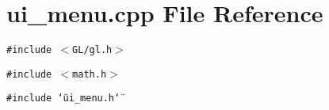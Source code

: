 \section{ui\_\-menu.cpp File Reference}
\label{ui__menu_8cpp}
{\tt \#include $<$GL/gl.h$>$}\par
{\tt \#include $<$math.h$>$}\par
{\tt \#include \char`\"{}ui\_\-menu.h\char`\"{}}\par
